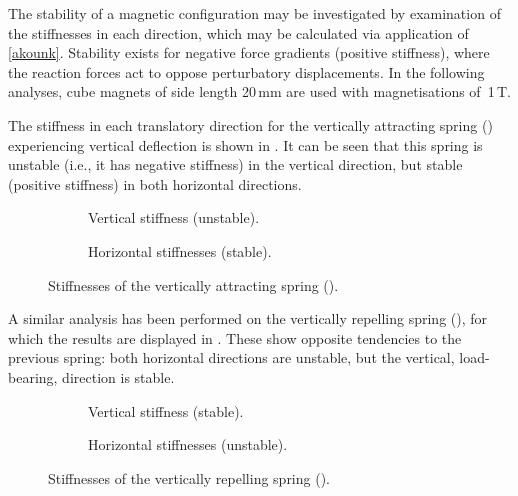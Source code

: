 The stability of a magnetic configuration may be investigated by
examination of the stiffnesses in each direction, which may be
calculated via application of \eqref{akounk}. Stability exists for
negative force gradients (positive stiffness), where the reaction
forces act to oppose perturbatory displacements. In the following
analyses, cube magnets of side length 20\,mm are used with
magnetisations of~1\,T.

The stiffness in each translatory direction for the vertically
attracting spring () experiencing vertical
deflection is shown in . It can be seen that this
spring is unstable (i.e., it has negative stiffness) in the vertical
direction, but stable (positive stiffness) in both horizontal
directions.

\begin{figure}[p]
  \begin{subfigure}
    \caption{Vertical stiffness (unstable).}
  \end{subfigure}
  \hfill
  \begin{subfigure}
    \caption{Horizontal stiffnesses (stable).}
  \end{subfigure}
  \caption{Stiffnesses of the vertically attracting spring ().}
\end{figure}

A similar analysis has been performed on the vertically repelling
spring (), for which the results are displayed
in . These show opposite tendencies to the previous
spring: both horizontal directions are unstable, but the vertical,
load-bearing, direction is stable.

\begin{figure}[p]
  \begin{subfigure}
    \caption{Vertical stiffness (stable).}  
  \end{subfigure}
  \hfill
  \begin{subfigure}
    \caption{Horizontal stiffnesses (unstable).}
  \end{subfigure}
  \caption{Stiffnesses of the vertically repelling spring ().}
\end{figure}

